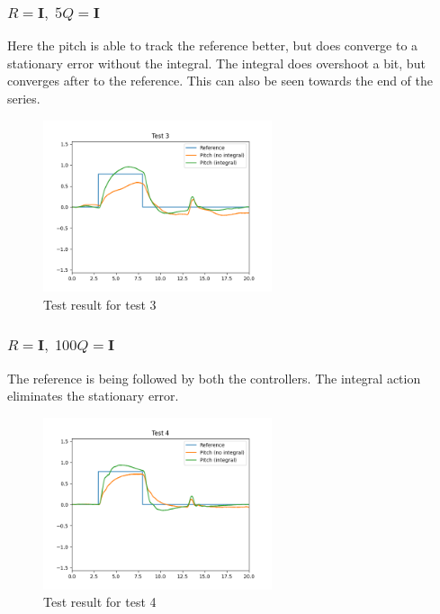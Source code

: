 \subsubsection*{$R = \mathbf{I},\; 5Q=\mathbf{I}$}
Here the pitch is able to track the reference better, but does converge to a stationary error without the integral. The integral does overshoot a bit, but converges after to the reference. This can also be seen towards the end of the series. 
\begin{figure}[H]
	\centering
	\includegraphics[width=0.6\textwidth]{figures/lab2-test3.png}
	\caption{Test result for test 3}
	\label{}
\end{figure}

\subsubsection*{$R = \mathbf{I},\; 100Q=\mathbf{I}$}
The reference is being followed by both the controllers. The integral action eliminates the stationary error.
\begin{figure}[H]
	\centering
	\includegraphics[width=0.6\textwidth]{figures/lab2-test4.png}
	\caption{Test result for test 4}
	\label{}
\end{figure}

